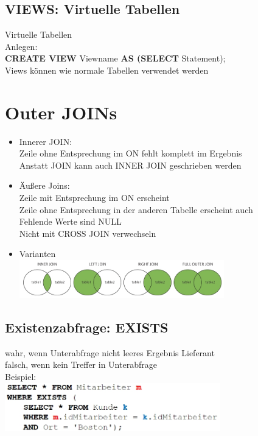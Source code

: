 \documentclass{scrreprt}
\newcommand\tab[1][1cm]{\hspace*{#1}}
\begin{document}
\subsection{VIEWS: Virtuelle Tabellen}
Virtuelle Tabellen 
\\Anlegen:
\\\tab \textbf{CREATE VIEW} Viewname \textbf{AS (SELECT} Statement);
\\Views können wie normale Tabellen verwendet werden
\section{Outer JOINs}
\begin{itemize}
  \item Innerer JOIN:
  \\\tab Zeile ohne Entsprechung im ON fehlt komplett im Ergebnis
  \\\tab Anstatt JOIN kann auch INNER JOIN geschrieben werden
  \item Äußere Joins:
  \\\tab Zeile mit Entsprechung im ON erscheint
  \\\tab Zeile ohne Entsprechung in der anderen Tabelle erscheint auch
  \\\tab Fehlende Werte sind NULL
  \\\tab Nicht mit CROSS JOIN verwechseln
  \item Varianten
  \\\includegraphics[width=0.7\textwidth]{"graphics/JOINS"}
\end{itemize}
\subsection{Existenzabfrage: EXISTS}
wahr, wenn Unterabfrage nicht leeres Ergebnis Lieferant
\\falsch, wenn kein Treffer in Unterabfrage
\\Beispiel:
\\\includegraphics[width=0.7\textwidth]{"graphics/EXISTS"}
\end{document}
